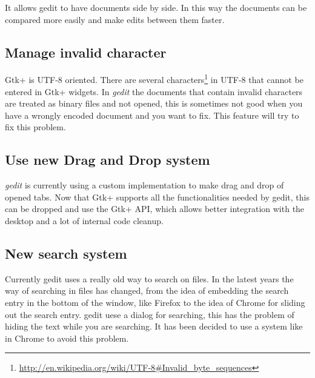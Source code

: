 It allows gedit to have documents side by side. In this way the documents can be compared more easily and make edits between them faster.

\subsection{Manage invalid character}\label{InvalidChars}

Gtk+ is UTF-8 oriented. There are several characters\footnote{\url{http://en.wikipedia.org/wiki/UTF-8\#Invalid_byte_sequences}} in UTF-8 that cannot be entered in Gtk+ widgets. In \emph{gedit} the documents that contain invalid characters are treated as binary files and not opened, this is sometimes not good when you have a wrongly encoded document and you want to fix. This feature will try to fix this problem.

\subsection{Use new Drag and Drop system}\label{DND}

\emph{gedit} is currently using a custom implementation to make drag and drop of opened tabs. Now that Gtk+ supports all the functionalities needed by gedit, this can be dropped and use the Gtk+ API, which allows better integration with the desktop and a lot of internal code cleanup.

\subsection{New search system}\label{SearchSystem}

Currently gedit uses a really old way to search on files. In the latest years the way of searching in files has changed, from the idea of embedding the search entry in the bottom of the window, like Firefox to the idea of Chrome for sliding out the search entry. gedit uese a dialog for searching, this has the problem of hiding the text while you are searching. It has been decided to use a system like in Chrome to avoid this problem.
